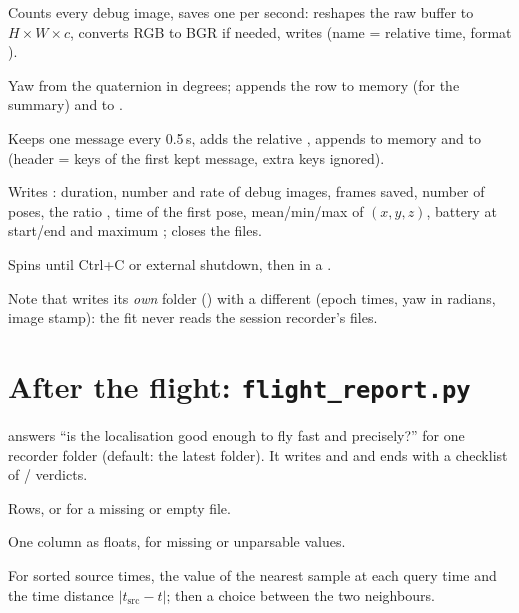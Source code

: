 Counts every debug image, saves one per second: reshapes the raw buffer to $H\times W\times c$, converts RGB to BGR
if needed, writes  (name = relative time, format ).

Yaw from the quaternion in degrees; appends the row to memory (for the summary) and to .

Keeps one message every 0.5\,s, adds the relative , appends to memory and to 
(header = keys of the first kept message, extra keys ignored).

Writes : duration, number and rate of debug images, frames saved, number of poses, the ratio
, time of the first pose, mean/min/max of $(x,y,z)$, battery at start/end and
maximum ; closes the files.

Spins until Ctrl+C or external shutdown, then  in a .

Note that  writes its \emph{own} folder () with a different
 (epoch times, yaw in radians, image stamp): the fit never reads the session recorder's files.

\section{After the flight: \texorpdfstring{\texttt{flight\_report.py}}{flight\_report.py}}

 answers ``is the localisation good enough to
fly fast and precisely?'' for one recorder folder (default: the latest  folder). It writes
 and  and ends with a checklist of \code{[OK]}/\code{[CHECK]} verdicts.

Rows, or \code{[]} for a missing or empty file.

One column as floats,  for missing or unparsable values.

For sorted source times, the value of the nearest sample at each query time and the time distance $|t_{\text{src}} - t|$;
 then a choice between the two neighbours.


